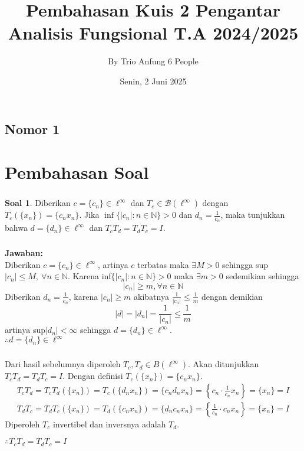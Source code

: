 \documentclass[aspectratio=169]{beamer}
\date{Senin, 2 Juni 2025}
\title[Pengantar Analisis Fungsional]{Pembahasan Kuis 2 Pengantar Analisis Fungsional T.A 2024/2025}
\author[Trio Anfung]{By Trio Anfung 6 People}
\institute[Matematika ITS]{Departemen Matematika\\ Institut Teknologi Sepuluh Nopember}
\theoremstyle{definition}
\newtheorem{definisi}{Definisi}
\newtheorem{soal}{Soal}
\begin{document}
    \begin{frame}
        \titlepage
\end{frame}

\subsection{Nomor 1}
\section{Pembahasan Soal}
\begin{frame}
  \frametitle{\insertsection}
  \begin{soal}
    Diberikan $c = \{c_n\} \in \ell^\infty$ dan $T_c \in \mathcal{B}(\ell^\infty)$ dengan $T_c(\{x_n\}) = \{c_n x_n\}$. Jika $\inf\{|c_n| : n \in \mathbb{N}\} > 0$ dan $d_n = \frac{1}{c_n}$, maka tunjukkan bahwa $d = \{d_n\} \in \ell^\infty$ dan $T_c T_d = T_d T_c = I$.
  \end{soal}

    
\end{frame}


\begin{frame}
  \frametitle{\insertsection}
  \framesubtitle{\insertsubsection}
  \textbf{Jawaban:}\\
  Diberikan $c = \{c_n\} \in \ell ^\infty$, artinya $c$ terbatas maka  $\exists M>0$ sehingga sup$|c_n| \leq M , \ \forall n \in \mathbb{N}$. Karena inf$\{|c_n| : n \in \mathbb{N}\}>0$ maka $\exists  m>0$ sedemikian sehingga 
  \[|c_n| \ge m ,\forall n \in \mathbb{N}\]
  Diberikan $d_n = \frac{1}{c_n}$, karena $|c_n| \ge m$ akibatnya $\frac{1}{|c_n|} \leq \frac{1}{m}$ dengan demikian 
  \[|d|  = |d_n|=\frac{1}{|c_n|}\leq \frac{1}{m}\] 
  artinya sup$|d_n|<\infty$ sehingga $d=\{d_n\}\in \ell^\infty$.\\
            
  $\therefore d=\{d_n\}\in \ell^\infty$ 
\end{frame}

\begin{frame}
  \frametitle{\insertsection}
  \framesubtitle{\insertsubsection}
  Dari hasil sebelumnya diperoleh $T_c,T_d \in B(\ell^\infty)$. Akan ditunjukkan $T_cT_d = T_dT_c = I$. Dengan definisi $T_c(\{x_n\}) = \{c_nx_n\}$.
  \begin{align*}
      T_cT_d = T_cT_d(\{{x_n}\})=T_c(\{d_nx_n\})=\{c_nd_nx_n\}=\left\{c_n\cdot\frac{1}{c_n}x_n\right\}=\{x_n\}=I
      \\
       T_dT_c = T_dT_c(\{{x_n}\})=T_d(\{c_nx_n\})=\{d_nc_nx_n\}=\left\{\frac{1}{c_n}\cdot c_nx_n\right\}=\{x_n\}=I
  \end{align*}
  Diperoleh $T_c$ invertibel dan inversnya adalah $T_d$.
  
  $\therefore T_cT_d=T_dT_c=I$ 
\end{frame}
\end{document}
